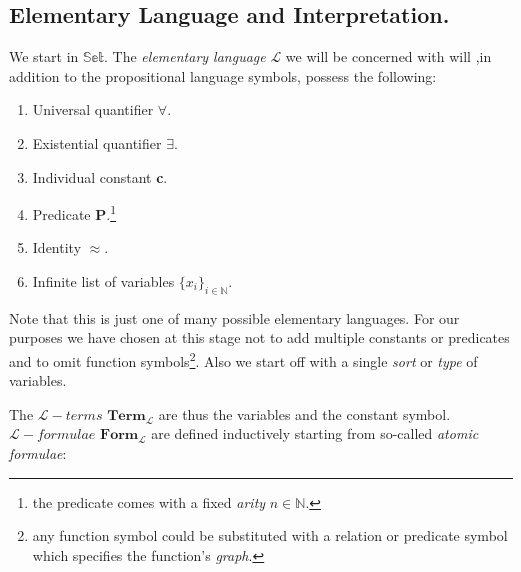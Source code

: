 %
%



\subsection{Elementary Language and Interpretation.}

We start in $\mathbb{Set}$. \newline
The \emph{elementary language} $\mathcal{L}$ we will be concerned with will ,in addition to the propositional language symbols, possess the following:
\begin{enumerate}[label=(\roman*)]
	\item Universal quantifier $\forall$.
	\item Existential quantifier $\exists$.
	\item Individual constant \textbf{c}.
	\item Predicate $\textbf{P}$.\footnote{the predicate comes with a fixed \emph{arity} $n\in \mathbb{N}$.}
	\item Identity $\approx$.
	\item Infinite list of variables $\{x_i\}_{i \in \mathbb{N}}$.
\end{enumerate}
Note that this is just one of many possible elementary languages. 
For our purposes we have chosen at this stage not to add multiple constants or predicates and to omit function symbols\footnote{any function symbol could be substituted with a relation or predicate symbol which specifies the function's \emph{graph}.}. Also we start off with a single \emph{sort} or \emph{type} of variables.\newline

The $\mathcal{L}-terms$  $\textbf{Term}_\mathcal{L}$ are thus the variables and the constant symbol. \newline
$\mathcal{L}-formulae$ $\textbf{Form}_\mathcal{L} $ are defined inductively starting from so-called \emph{atomic formulae}:

